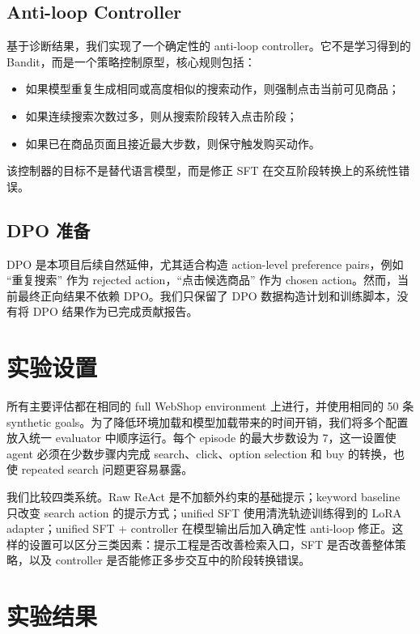\documentclass[11pt]{article}
\begin{document}
\subsection{Anti-loop Controller}

基于诊断结果，我们实现了一个确定性的 anti-loop controller。它不是学习得到的 Bandit，而是一个策略控制原型，核心规则包括：

\begin{itemize}
    \item 如果模型重复生成相同或高度相似的搜索动作，则强制点击当前可见商品；
    \item 如果连续搜索次数过多，则从搜索阶段转入点击阶段；
    \item 如果已在商品页面且接近最大步数，则保守触发购买动作。
\end{itemize}

该控制器的目标不是替代语言模型，而是修正 SFT 在交互阶段转换上的系统性错误。

\subsection{DPO 准备}

DPO 是本项目后续自然延伸，尤其适合构造 action-level preference pairs，例如 ``重复搜索'' 作为 rejected action，``点击候选商品'' 作为 chosen action。然而，当前最终正向结果不依赖 DPO。我们只保留了 DPO 数据构造计划和训练脚本，没有将 DPO 结果作为已完成贡献报告。

\section{实验设置}

所有主要评估都在相同的 full WebShop environment 上进行，并使用相同的 50 条 synthetic goals。为了降低环境加载和模型加载带来的时间开销，我们将多个配置放入统一 evaluator 中顺序运行。每个 episode 的最大步数设为 7，这一设置使 agent 必须在少数步骤内完成 search、click、option selection 和 buy 的转换，也使 repeated search 问题更容易暴露。

我们比较四类系统。Raw ReAct 是不加额外约束的基础提示；keyword baseline 只改变 search action 的提示方式；unified SFT 使用清洗轨迹训练得到的 LoRA adapter；unified SFT + controller 在模型输出后加入确定性 anti-loop 修正。这样的设置可以区分三类因素：提示工程是否改善检索入口，SFT 是否改善整体策略，以及 controller 是否能修正多步交互中的阶段转换错误。

\section{实验结果}
\end{document}
